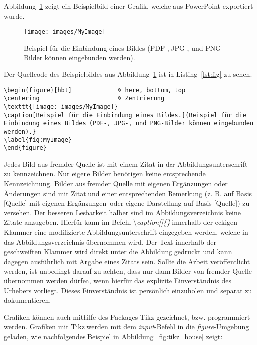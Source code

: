 Abbildung~\ref{fig:MyImage} zeigt ein Beispielbild einer Grafik, welche aus PowerPoint exportiert wurde.

\begin{figure}[hbt]
	\centering
	\texttt{[image: images/MyImage]}
	\caption[Beispiel für die Einbindung eines Bildes.]{Beispiel für die Einbindung eines Bildes (PDF-, JPG-, und PNG-Bilder können eingebunden werden).}
	\label{fig:MyImage}
\end{figure}

Der Quellcode des Beispielbildes aus Abbildung~\ref{fig:MyImage} ist in Listing~\ref{lst:fig} zu sehen.

\clearpage

\begin{lstlisting}[caption=Quellcode der Abbildung~\ref{fig:MyImage}.,label=lst:fig]
\begin{figure}[hbt]				% here, bottom, top
\centering						% Zentrierung
\texttt{[image: images/MyImage]}		
\caption[Beispiel für die Einbindung eines Bildes.]{Beispiel für die Einbindung eines Bildes (PDF-, JPG-, und PNG-Bilder können eingebunden werden).}
\label{fig:MyImage}
\end{figure}
\end{lstlisting}

Jedes Bild aus fremder Quelle ist mit einem Zitat in der Abbildungsunterschrift zu kennzeichnen. Nur eigene Bilder benötigen keine entsprechende Kennzeichnung. Bilder aus fremder Quelle mit eigenen Ergänzungen oder Änderungen sind mit Zitat und einer entsprechenden Bemerkung (z. B. \glqq auf Basis [Quelle] mit eigenen Ergänzungen\grqq~oder \glqq eigene Darstellung auf Basis [Quelle]\grqq) zu versehen. Der besseren Lesbarkeit halber sind im Abbildungsverzeichnis keine Zitate anzugeben. Hierfür kann im Befehl \textbackslash \textit{caption[]\{\}} innerhalb der eckigen Klammer eine modifizierte Abbildungsunterschrift eingegeben werden, welche in das Abbildungsverzeichnis übernommen wird. Der Text innerhalb der geschweiften Klammer wird direkt unter die Abbildung gedruckt und kann dagegen ausführlich mit Angabe eines Zitats sein. Sollte die Arbeit veröffentlicht werden, ist unbedingt darauf zu achten, dass nur dann Bilder von fremder Quelle übernommen werden dürfen, wenn hierfür das explizite Einverständnis des Urhebers vorliegt. Dieses Einverständnis ist persönlich einzuholen und separat zu dokumentieren.

Grafiken können auch mithilfe des Packages Tikz gezeichnet, bzw. programmiert werden. Grafiken mit Tikz werden mit dem \textit{input}-Befehl in die \textit{figure}-Umgebung geladen, wie nachfolgendes Beispiel in Abbildung~\ref{fig:tikz_house} zeigt:


